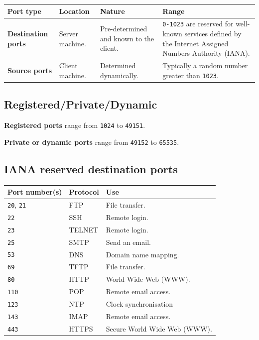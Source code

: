 \documentclass[a4paper]{systems-software}
\begin{document}
\begin{longtabu} to \textwidth {| X[1,l] | X[1,l] | X[2,l] | X[2, l] |}
	\hline
	\textbf{Port type} & \textbf{Location} & \textbf{Nature} & \textbf{Range}
	\\ \hline
	\textbf{Destination ports} & Server machine. &
	Pre-determined and known to the client. &
	\texttt{0-1023} are reserved for well-known services defined by the Internet Assigned Numbers Authority (IANA).
	\\ \hline
	\textbf{Source ports} & Client machine. &
	Determined dynamically. &
	Typically a random number greater than \texttt{1023}.
	\\ \hline
\end{longtabu}


\subsection*{Registered/Private/Dynamic}

\textbf{Registered ports} range from \texttt{1024} to \texttt{49151}.

\textbf{Private or dynamic ports} range from \texttt{49152} to \texttt{65535}.


\newpage

\subsection*{IANA reserved destination ports}

\begin{longtabu} to \textwidth {| X[1,l] | X[1,l] | X[4,l] |}
	\hline
	\textbf{Port number(s)} & \textbf{Protocol} & \textbf{Use}
	\\ \hline
	\texttt{20}, \texttt{21} & FTP & File transfer.
	\\ \hline
	\texttt{22} & SSH & Remote login.
	\\ \hline
	\texttt{23} & TELNET & Remote login.
	\\ \hline
	\texttt{25} & SMTP & Send an email.
	\\ \hline
	\texttt{53} & DNS & Domain name mapping.
	\\ \hline
	\texttt{69} & TFTP & File transfer.
	\\ \hline
	\texttt{80} & HTTP & World Wide Web (WWW).
	\\ \hline
	\texttt{110} & POP & Remote email access.
	\\ \hline
	\texttt{123} & NTP & Clock synchronisation
	\\ \hline
	\texttt{143} & IMAP & Remote email access.
	\\ \hline
	\texttt{443} & HTTPS & Secure World Wide Web (WWW).
	\\ \hline
\end{longtabu}
\end{document}
